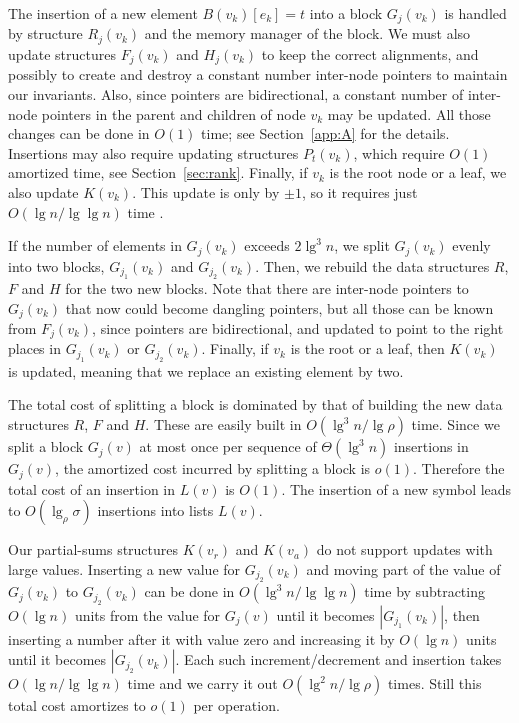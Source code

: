 \documentclass[11pt]{article}
\newcommand{\cP}{{ K}}
\begin{document}
The insertion of a new element $B(v_k)[e_k]=t$ into a block $G_j(v_k)$ 
is handled by structure $R_j(v_k)$ and the memory manager of the block.
We must also update structures
$F_j(v_k)$ and $H_j(v_k)$ to keep the correct alignments, and possibly
to create and destroy a constant number inter-node pointers to maintain 
our invariants.
Also, since pointers are bidirectional, a constant number of inter-node 
pointers in the parent and children of node $v_k$ may be updated. All those 
changes can be done in $O(1)$ time; see Section~\ref{app:A} for the details. 
Insertions may also require updating structures $P_t(v_k)$, which require
$O(1)$ amortized time, see Section~\ref{sec:rank}. 
Finally, if $v_k$ is the root node or a leaf, we also update $\cP(v_k)$.
This update is only by $\pm 1$, so it requires just
$O(\lg n /\lg\lg n)$ time \cite[Lem.~1]{NS10}.

If the number of elements in $G_j(v_k)$ exceeds 
$2\lg^3 n$, we split $G_j(v_k)$ evenly into two blocks, $G_{j_1}(v_k)$ and 
$G_{j_2}(v_k)$.
Then, we rebuild the data structures $R$, $F$ and $H$ for the two new blocks.
Note that there are inter-node pointers to $G_j(v_k)$ that now could
become dangling pointers, but all those can be known from $F_j(v_k)$, since
pointers are bidirectional, and updated to point to the right places in
$G_{j_1}(v_k)$ or $G_{j_2}(v_k)$.
Finally, if $v_k$ is the root or a leaf, then $\cP(v_k)$ is updated,
meaning that we replace an existing element by two.

The total cost of splitting a block is dominated by that
of building the new data structures $R$, $F$ and $H$.
These are easily built in $O(\lg^3 n/\lg\rho)$ time. Since
we split a block $G_j(v)$ at most once per sequence of $\Theta(\lg^3 n)$ 
insertions in $G_j(v)$, the amortized cost incurred by splitting a block 
is $o(1)$. Therefore the total cost of an insertion in $L(v)$ is $O(1)$.
The insertion of a new 
symbol leads to $O(\lg_\rho \sigma)$ insertions into 
lists $L(v)$. 

Our partial-sums structures $\cP(v_r)$ and $\cP(v_a)$ do not support updates with large 
values. Inserting a new value for $G_{j_2}(v_k)$ and moving part of the value 
of $G_{j}(v_k)$ to $G_{j_2}(v_k)$ can be done in 
$O(\lg^3 n/\lg \lg n)$ time by subtracting $O(\lg n)$ units from
the value for $G_j(v)$ until it becomes $|G_{j_1}(v_k)|$, then inserting a number after
it with value zero and increasing it by $O(\lg n)$ units until it becomes
$|G_{j_2}(v_k)|$. Each such increment/decrement and insertion takes
$O(\lg n /\lg\lg n)$ time \cite[Lem.~1]{NS10} and we carry it out
$O(\lg^2 n/\lg\rho)$ times. Still this total cost amortizes to $o(1)$ per operation.
\end{document}
